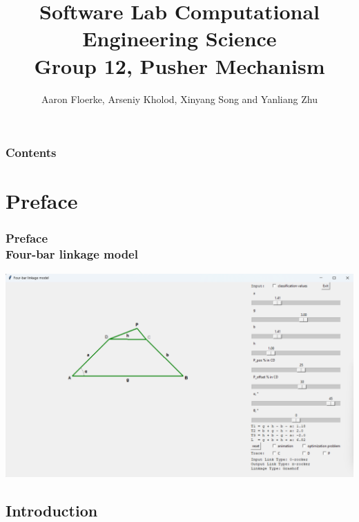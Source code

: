 \documentclass[ucs,10pt]{beamer}
\begin{document}
\title[{\tt info@stce.rwth-aachen.de}]{\textcolor{rwth-blue}{Software Lab Computational Engineering Science} \vspace{.2cm} \\ {\small Group 12, Pusher Mechanism}}
\author[Group 12, Pusher Mechanism]{Aaron Floerke, Arseniy Kholod, Xinyang Song and Yanliang Zhu} 
\date[]{}

\begin{frame}[plain]
\titlepage
\end{frame}

\begin{frame}
	\frametitle{Contents}
	\vspace*{2mm}
	\tableofcontents
\end{frame}

\section{Preface}

\begin{frame}
\frametitle{Preface \\
	\small \color{rwth-blue} Four-bar linkage model}
	\begin{center}
		\includegraphics[width=\linewidth]{./Figures/GUI_screen.png}
	\end{center}
\end{frame}

\subsection{Introduction}
\end{document}
